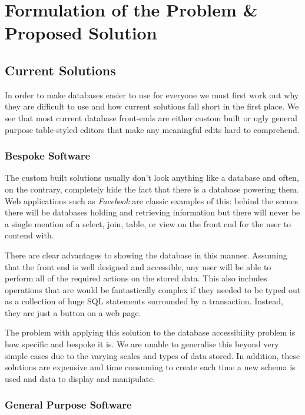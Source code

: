 \chapter{Formulation of the Problem \& Proposed Solution}

\section{Current Solutions}

In order to make databases easier to use for everyone we must first work out
why they are difficult to use and how current solutions fall short in the first
place. We see that most current database front-ends are either custom built or
ugly general purpose table-styled editors that make any meaningful edits hard
to comprehend.

\subsection{Bespoke Software}

The custom built solutions usually don't look anything like a database
and often, on the contrary, completely hide the fact that there is
a database powering them. Web applications such as \emph{Facebook} are
classic examples of this: behind the scenes there will be databases
holding and retrieving information but there will never be a single
mention of a select, join, table, or view on the front end for the user
to contend with.

There are clear advantages to showing the database in this manner.
Assuming that the front end is well designed and accessible, any user
will be able to perform all of the required actions on the stored data.
This also includes operations that are would be fantastically complex if
they needed to be typed out as a collection of huge \ac{SQL} statements
surrounded by a transaction. Instead, they are just a button on a web
page.

The problem with applying this solution to the database accessibility
problem is how specific and bespoke it is. We are unable to generalise
this beyond very simple cases due to the varying scales and types of
data stored. In addition, these solutions are expensive and time
consuming to create each time a new schema is used and data to display
and manipulate.

\subsection{General Purpose Software}

